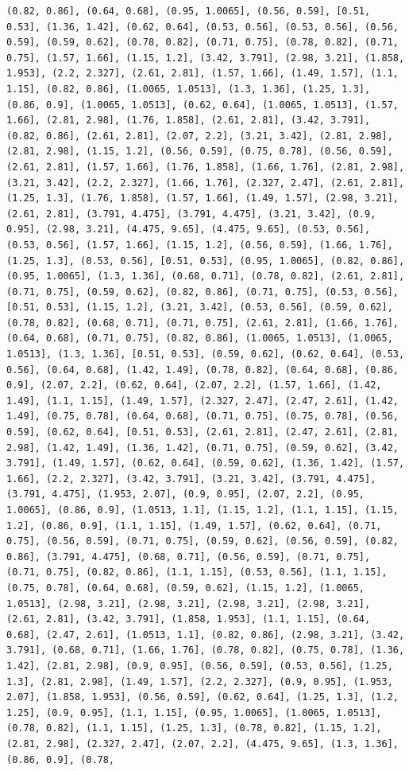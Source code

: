 \documentclass[12pt,fleqn]{article}\usepackage{../common}
\begin{document}
\begin{verbatim}
(0.82, 0.86], (0.64, 0.68], (0.95, 1.0065], (0.56, 0.59], [0.51, 0.53], (1.36, 1.42], (0.62, 0.64], (0.53, 0.56], (0.53, 0.56], (0.56, 0.59], (0.59, 0.62], (0.78, 0.82], (0.71, 0.75], (0.78, 0.82], (0.71, 0.75], (1.57, 1.66], (1.15, 1.2], (3.42, 3.791], (2.98, 3.21], (1.858, 1.953], (2.2, 2.327], (2.61, 2.81], (1.57, 1.66], (1.49, 1.57], (1.1, 1.15], (0.82, 0.86], (1.0065, 1.0513], (1.3, 1.36], (1.25, 1.3], (0.86, 0.9], (1.0065, 1.0513], (0.62, 0.64], (1.0065, 1.0513], (1.57, 1.66], (2.81, 2.98], (1.76, 1.858], (2.61, 2.81], (3.42, 3.791], (0.82, 0.86], (2.61, 2.81], (2.07, 2.2], (3.21, 3.42], (2.81, 2.98], (2.81, 2.98], (1.15, 1.2], (0.56, 0.59], (0.75, 0.78], (0.56, 0.59], (2.61, 2.81], (1.57, 1.66], (1.76, 1.858], (1.66, 1.76], (2.81, 2.98], (3.21, 3.42], (2.2, 2.327], (1.66, 1.76], (2.327, 2.47], (2.61, 2.81], (1.25, 1.3], (1.76, 1.858], (1.57, 1.66], (1.49, 1.57], (2.98, 3.21], (2.61, 2.81], (3.791, 4.475], (3.791, 4.475], (3.21, 3.42], (0.9, 0.95], (2.98, 3.21], (4.475, 9.65], (4.475, 9.65], (0.53, 0.56], (0.53, 0.56], (1.57, 1.66], (1.15, 1.2], (0.56, 0.59], (1.66, 1.76], (1.25, 1.3], (0.53, 0.56], [0.51, 0.53], (0.95, 1.0065], (0.82, 0.86], (0.95, 1.0065], (1.3, 1.36], (0.68, 0.71], (0.78, 0.82], (2.61, 2.81], (0.71, 0.75], (0.59, 0.62], (0.82, 0.86], (0.71, 0.75], (0.53, 0.56], [0.51, 0.53], (1.15, 1.2], (3.21, 3.42], (0.53, 0.56], (0.59, 0.62], (0.78, 0.82], (0.68, 0.71], (0.71, 0.75], (2.61, 2.81], (1.66, 1.76], (0.64, 0.68], (0.71, 0.75], (0.82, 0.86], (1.0065, 1.0513], (1.0065, 1.0513], (1.3, 1.36], [0.51, 0.53], (0.59, 0.62], (0.62, 0.64], (0.53, 0.56], (0.64, 0.68], (1.42, 1.49], (0.78, 0.82], (0.64, 0.68], (0.86, 0.9], (2.07, 2.2], (0.62, 0.64], (2.07, 2.2], (1.57, 1.66], (1.42, 1.49], (1.1, 1.15], (1.49, 1.57], (2.327, 2.47], (2.47, 2.61], (1.42, 1.49], (0.75, 0.78], (0.64, 0.68], (0.71, 0.75], (0.75, 0.78], (0.56, 0.59], (0.62, 0.64], [0.51, 0.53], (2.61, 2.81], (2.47, 2.61], (2.81, 2.98], (1.42, 1.49], (1.36, 1.42], (0.71, 0.75], (0.59, 0.62], (3.42, 3.791], (1.49, 1.57], (0.62, 0.64], (0.59, 0.62], (1.36, 1.42], (1.57, 1.66], (2.2, 2.327], (3.42, 3.791], (3.21, 3.42], (3.791, 4.475], (3.791, 4.475], (1.953, 2.07], (0.9, 0.95], (2.07, 2.2], (0.95, 1.0065], (0.86, 0.9], (1.0513, 1.1], (1.15, 1.2], (1.1, 1.15], (1.15, 1.2], (0.86, 0.9], (1.1, 1.15], (1.49, 1.57], (0.62, 0.64], (0.71, 0.75], (0.56, 0.59], (0.71, 0.75], (0.59, 0.62], (0.56, 0.59], (0.82, 0.86], (3.791, 4.475], (0.68, 0.71], (0.56, 0.59], (0.71, 0.75], (0.71, 0.75], (0.82, 0.86], (1.1, 1.15], (0.53, 0.56], (1.1, 1.15], (0.75, 0.78], (0.64, 0.68], (0.59, 0.62], (1.15, 1.2], (1.0065, 1.0513], (2.98, 3.21], (2.98, 3.21], (2.98, 3.21], (2.98, 3.21], (2.61, 2.81], (3.42, 3.791], (1.858, 1.953], (1.1, 1.15], (0.64, 0.68], (2.47, 2.61], (1.0513, 1.1], (0.82, 0.86], (2.98, 3.21], (3.42, 3.791], (0.68, 0.71], (1.66, 1.76], (0.78, 0.82], (0.75, 0.78], (1.36, 1.42], (2.81, 2.98], (0.9, 0.95], (0.56, 0.59], (0.53, 0.56], (1.25, 1.3], (2.81, 2.98], (1.49, 1.57], (2.2, 2.327], (0.9, 0.95], (1.953, 2.07], (1.858, 1.953], (0.56, 0.59], (0.62, 0.64], (1.25, 1.3], (1.2, 1.25], (0.9, 0.95], (1.1, 1.15], (0.95, 1.0065], (1.0065, 1.0513], (0.78, 0.82], (1.1, 1.15], (1.25, 1.3], (0.78, 0.82], (1.15, 1.2], (2.81, 2.98], (2.327, 2.47], (2.07, 2.2], (4.475, 9.65], (1.3, 1.36], (0.86, 0.9], (0.78, 
\end{verbatim}
\end{document}
